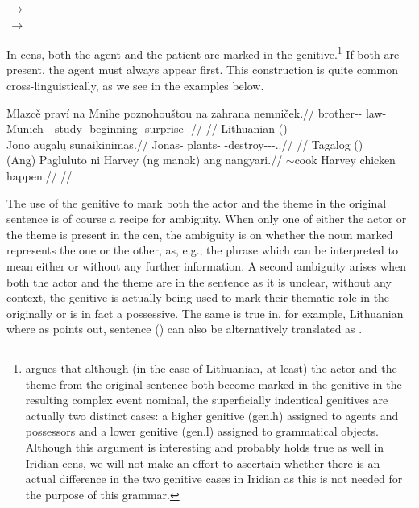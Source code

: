 \pex
    \a {}\,$\rightarrow$\,\\
    \a {}\,$\rightarrow$\,\\
\xe

In {\sc cen}s, both the agent and the patient are marked in the
genitive.\footnote{\textcite{serekaite2020} argues that although
(in the case of Lithuanian, at least) the actor and the theme from the original
sentence both become marked in the genitive in the resulting complex event
nominal, the superficially indentical genitives are actually two distinct cases:
a higher genitive ({\sc gen.h}) assigned to agents and possessors and a lower
genitive ({\sc gen.l}) assigned to grammatical objects. Although this argument
is interesting and probably holds true as well in Iridian {\sc cen}s, we will
not make an effort to ascertain whether there is an actual difference in the two
genitive cases in Iridian as this is not needed for the purpose of this
grammar.} If both are present, the agent must always appear first. This
construction is quite common cross-linguistically, as we see in the examples
below.

\pex
\a\begingl
    \gla Mlazcě praví na Mnihe poznohouštou na zahrana nemniček.//
    \glb brother-\Dim{}-\Gen{} law-\Gen{} \Loc{} Munich-\Acc{} \Ger{}-study-\Nz{} \Loc{} beginning-\Acc{} surprise-\Av{}-\Pf{}//
    \glft {}//
\endgl
\a Lithuanian (\cite[1]{serekaite2020})\\
\begingl
    \gla Jono augal\k{u} sunaikinimas.//
    \glb Jonas-\Gen{} plants-\Gen{} \Pfv{}-destroy-\Caus{}-\Nz-\Nom{}.\M{}.\Sg{}//
    \glft {}//
\endgl
\a Tagalog (\cite[22]{hsieh2019})\\
\begingl
    \gla (Ang) Pagluluto ni Harvey (ng manok) ang nangyari.//
    \glb \Nom{} \Ger{}$\sim$cook \Gen{} Harvey \Gen{} chicken \Nom{} happen.\Pfv{}//
    \glft {}//
\endgl
\xe

The use of the genitive to mark both the actor and the theme in
the original sentence is of course a recipe for ambiguity. When only one of
either the actor or the theme is present in the {\sc cen}, the ambiguity is on
whether the noun marked represents the one or the other, as, e.g., the phrase
 which can be interpreted to mean either  or  without any further
information. A second ambiguity arises when both the actor and the theme are in
the sentence as it is unclear, without any context, the genitive is actually
being used to mark their thematic role in the originally or is in fact a
possessive. The same is true in, for example, Lithuanian where
as \textcite{serekaite2020} points out, sentence
() can also be alternatively translated as
.

